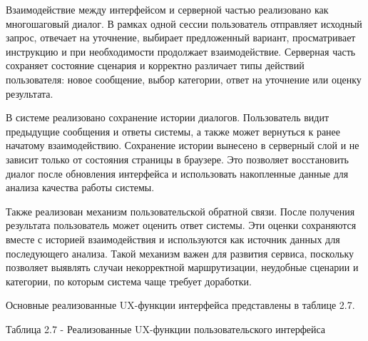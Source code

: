 \documentclass[14pt,a4paper]{extarticle}
\renewcommand{\textbf}[1]{#1}
\numberwithin{figure}{section}
\numberwithin{table}{section}
\begin{document}
Взаимодействие между интерфейсом и серверной частью реализовано как
многошаговый диалог. В рамках одной сессии пользователь отправляет
исходный запрос, отвечает на уточнение, выбирает предложенный вариант,
просматривает инструкцию и при необходимости продолжает взаимодействие.
Серверная часть сохраняет состояние сценария и корректно различает типы
действий пользователя: новое сообщение, выбор категории, ответ на
уточнение или оценку результата.

В системе реализовано сохранение истории диалогов. Пользователь видит
предыдущие сообщения и ответы системы, а также может вернуться к ранее
начатому взаимодействию. Сохранение истории вынесено в серверный слой и
не зависит только от состояния страницы в браузере. Это позволяет
восстановить диалог после обновления интерфейса и использовать
накопленные данные для анализа качества работы системы.

Также реализован механизм пользовательской обратной связи. После
получения результата пользователь может оценить ответ системы. Эти
оценки сохраняются вместе с историей взаимодействия и используются как
источник данных для последующего анализа. Такой механизм важен для
развития сервиса, поскольку позволяет выявлять случаи некорректной
маршрутизации, неудобные сценарии и категории, по которым система чаще
требует доработки.

Основные реализованные UX-функции интерфейса представлены в таблице 2.7.

\textbf{Таблица 2.7 - Реализованные UX-функции пользовательского
интерфейса}
\end{document}
